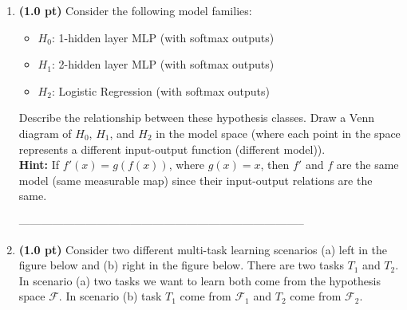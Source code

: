 \documentclass{article}
\begin{document}
\begin{enumerate}
%
\item {\bf (1.0 pt)} Consider the following model families:
%
\begin{itemize}
%
\item
    $H_{0}$: 1-hidden layer MLP (with softmax outputs)
%
\item
    $H_{1}$: 2-hidden layer MLP (with softmax outputs)
%
\item
    $H_{2}$: Logistic Regression (with softmax outputs)
%
\end{itemize}
%
Describe the relationship between these hypothesis classes.
%
Draw a Venn diagram of $H_{0}$, $H_{1}$, and $H_{2}$ in the model space (where
each point in the space represents a different input-output function (different
model)).
\\
{\bf Hint:}
%
If $f'(x) = g(f(x))$, where $g(x) = x$, then $f'$ and $f$ are the same model
(same measurable map) since their input-output relations are the same.

%

%
\vfill




%

%


-----------------------------------------------------------------------------

\newpage
%
\item {\bf (1.0 pt)} Consider two different multi-task learning scenarios (a)  left in the figure below
and (b)  right in the figure below.
%
There are two tasks $T_{1}$ and $T_{2}$.
%
In scenario (a) two tasks we want to learn both come from the hypothesis space
$\mathcal{F}$.
%
In scenario (b) task $T_{1}$ come from $\mathcal{F}_{1}$ and $T_{2}$ come from
$\mathcal{F}_{2}$.
%


\end{enumerate}
\end{document}
